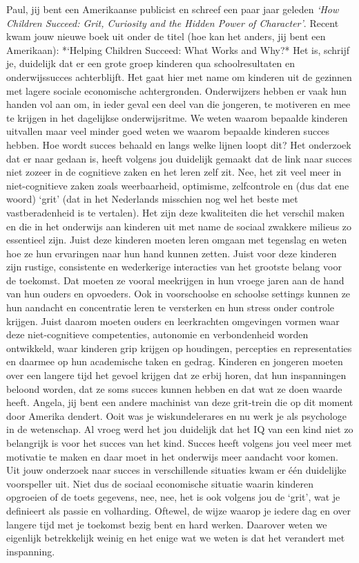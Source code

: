 \documentclass[]{book}
\begin{document}
Paul, jij bent een Amerikaanse publicist en schreef een paar jaar
geleden \emph{`How Children Succeed: Grit, Curiosity and the Hidden
Power of Character'}. Recent kwam jouw nieuwe boek uit onder de titel
(hoe kan het anders, jij bent een Amerikaan): *`Helping Children
Succeed: What Works and Why?* Het is, schrijf je, duidelijk dat er een
grote groep kinderen qua schoolresultaten en onderwijssucces
achterblijft. Het gaat hier met name om kinderen uit de gezinnen met
lagere sociale economische achtergronden. Onderwijzers hebben er vaak
hun handen vol aan om, in ieder geval een deel van die jongeren, te
motiveren en mee te krijgen in het dagelijkse onderwijsritme. We weten
waarom bepaalde kinderen uitvallen maar veel minder goed weten we waarom
bepaalde kinderen succes hebben. Hoe wordt succes behaald en langs welke
lijnen loopt dit? Het onderzoek dat er naar gedaan is, heeft volgens jou
duidelijk gemaakt dat de link naar succes niet zozeer in de cognitieve
zaken en het leren zelf zit. Nee, het zit veel meer in niet-cognitieve
zaken zoals weerbaarheid, optimisme, zelfcontrole en (dus dat ene woord)
`grit' (dat in het Nederlands misschien nog wel het beste met
vastberadenheid is te vertalen). Het zijn deze kwaliteiten die het
verschil maken en die in het onderwijs aan kinderen uit met name de
sociaal zwakkere milieus zo essentieel zijn. Juist deze kinderen moeten
leren omgaan met tegenslag en weten hoe ze hun ervaringen naar hun hand
kunnen zetten. Juist voor deze kinderen zijn rustige, consistente en
wederkerige interacties van het grootste belang voor de toekomst. Dat
moeten ze vooral meekrijgen in hun vroege jaren aan de hand van hun
ouders en opvoeders. Ook in voorschoolse en schoolse settings kunnen ze
hun aandacht en concentratie leren te versterken en hun stress onder
controle krijgen. Juist daarom moeten ouders en leerkrachten omgevingen
vormen waar deze niet-cognitieve competenties, autonomie en
verbondenheid worden ontwikkeld, waar kinderen grip krijgen op
houdingen, percepties en representaties en daarmee op hun academische
taken en gedrag. Kinderen en jongeren moeten over een langere tijd het
gevoel krijgen dat ze erbij horen, dat hun inspanningen beloond worden,
dat ze soms succes kunnen hebben en dat wat ze doen waarde heeft.
Angela, jij bent een andere machinist van deze grit-trein die op dit
moment door Amerika dendert. Ooit was je wiskundelerares en nu werk je
als psychologe in de wetenschap. Al vroeg werd het jou duidelijk dat het
IQ van een kind niet zo belangrijk is voor het succes van het kind.
Succes heeft volgens jou veel meer met motivatie te maken en daar moet
in het onderwijs meer aandacht voor komen. Uit jouw onderzoek naar
succes in verschillende situaties kwam er één duidelijke voorspeller
uit. Niet dus de sociaal economische situatie waarin kinderen opgroeien
of de toets gegevens, nee, nee, het is ook volgens jou de `grit', wat je
definieert als passie en volharding. Oftewel, de wijze waarop je iedere
dag en over langere tijd met je toekomst bezig bent en hard werken.
Daarover weten we eigenlijk betrekkelijk weinig en het enige wat we
weten is dat het verandert met inspanning.
\end{document}
